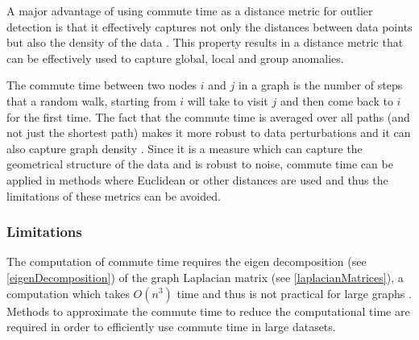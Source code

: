 A major advantage of using commute time as a distance metric for outlier
detection is that it effectively captures not only the distances between data
points but also the density of the data \citeNeeded{}. This property results in
a distance metric that can be effectively used to capture global, local and
group anomalies.

The commute time between two nodes $i$ and $j$ in a graph is the number of steps
that a random walk, starting from $i$ will take to visit $j$ and then come back
to $i$ for the first time. The fact that the commute time is averaged over all
paths (and not just the shortest path) makes it more robust to data
perturbations and it can also capture graph density \cite{Khoa:2012}. Since it
is a measure which can capture the geometrical structure of the data and is
robust to noise, commute time can be applied in methods where Euclidean or other
distances are used and thus the limitations of these metrics can be avoided.

\subsubsection{Limitations}
\label{commuteTime:limitations}
The computation of commute time requires the eigen decomposition (see
\autoref{eigenDecomposition}) of the graph Laplacian matrix (see
\autoref{laplacianMatrices}), a computation which takes $O(n^3)$ time and thus
is not practical for large graphs \citeNeeded{}. Methods to approximate the
commute time to reduce the computational time are required in order to
efficiently use commute time in large datasets.

